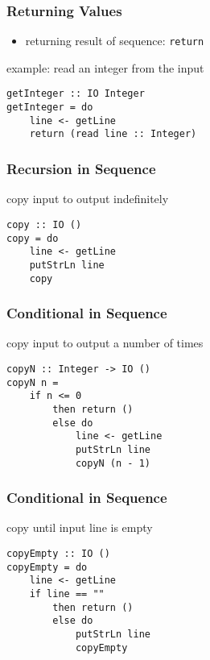 \documentclass[dvipsnames]{beamer}
\theoremstyle{plain}
\begin{document}
\begin{frame}[fragile]
  \frametitle{Returning Values}

  \begin{itemize}
    \item returning result of sequence: \lstinline|return|
  \end{itemize}

  \begin{exampleblock}{example: read an integer from the input}
    \begin{lstlisting}
getInteger :: IO Integer
getInteger = do
    line <- getLine
    return (read line :: Integer)
    \end{lstlisting}
  \end{exampleblock}
\end{frame}

\begin{frame}[fragile]
  \frametitle{Recursion in Sequence}

  \begin{exampleblock}{copy input to output indefinitely}
    \begin{lstlisting}
copy :: IO ()
copy = do
    line <- getLine
    putStrLn line
    copy
    \end{lstlisting}
  \end{exampleblock}
\end{frame}

\begin{frame}[fragile]
  \frametitle{Conditional in Sequence}

  \begin{exampleblock}{copy input to output a number of times}
    \begin{lstlisting}
copyN :: Integer -> IO ()
copyN n =
    if n <= 0
        then return ()
        else do
            line <- getLine
            putStrLn line
            copyN (n - 1)
    \end{lstlisting}
  \end{exampleblock}
\end{frame}

\begin{frame}[fragile]
  \frametitle{Conditional in Sequence}

  \begin{exampleblock}{copy until input line is empty}
    \begin{lstlisting}
copyEmpty :: IO ()
copyEmpty = do
    line <- getLine
    if line == ""
        then return ()
        else do
            putStrLn line
            copyEmpty
    \end{lstlisting}
  \end{exampleblock}
\end{frame}
\end{document}
